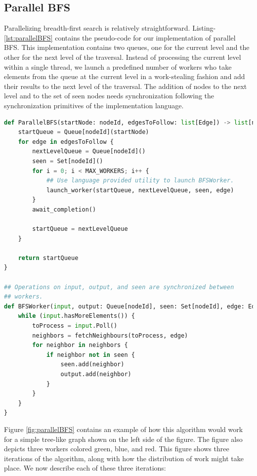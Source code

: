 \subsection{Parallel BFS}
Parallelizing breadth-first search is relatively straightforward.
Listing-\ref{lst:parallelBFS} contains the pseudo-code for our implementation of
parallel BFS. This implementation contains two queues, one for the current level
and the other for the next level of the traversal. Instead of processing the
current level within a single thread, we launch a predefined number of workers
who take elements from the queue at the current level in a work-stealing
fashion and add their results to the next level of the traversal. The addition
of nodes to the next level and to the set of seen nodes needs synchronization
following the synchronization primitives of the implementation language.
\begin{lstlisting}[caption={Parallel BFS}, label={lst:parallelBFS}, captionpos=b, language=Python]
def ParallelBFS(startNode: nodeId, edgesToFollow: list[Edge]) -> list[nodeId] {
    startQueue = Queue[nodeId](startNode)
    for edge in edgesToFollow {
        nextLevelQueue = Queue[nodeId]()
        seen = Set[nodeId]()
        for i = 0; i < MAX_WORKERS; i++ {
            ## Use language provided utility to launch BFSWorker.
            launch_worker(startQueue, nextLevelQueue, seen, edge)
        }
        await_completion()

        startQueue = nextLevelQueue
    }

    return startQueue
}

## Operations on input, output, and seen are synchronized between
## workers. 
def BFSWorker(input, output: Queue[nodeId], seen: Set[nodeId], edge: Edge) {
    while (input.hasMoreElements()) {
        toProcess = input.Poll()
        neighbors = fetchNeighbours(toProcess, edge)
        for neighbor in neighbors {
            if neighbor not in seen {
                seen.add(neighbor)
                output.add(neighbor)
            }
        }
    }
}
\end{lstlisting}
Figure \ref{fig:parallelBFS} contains an example of how this algorithm would
work for a simple tree-like graph shown on the left side of the figure. The
figure also depicts three workers colored green, blue, and red.
This figure shows three iterations of the algorithm, along with how the
distribution of work might take place. We now describe each of these three
iterations:
